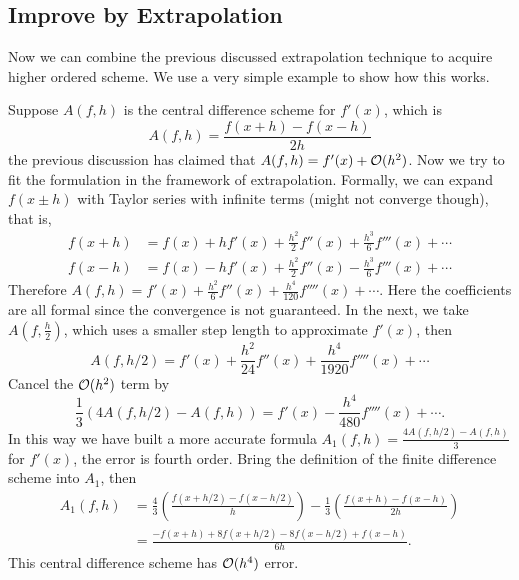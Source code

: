 \subsection{Improve by Extrapolation}
Now we can combine the previous discussed extrapolation technique to acquire higher ordered scheme. We use a very simple example to show how this works. 
\begin{example}
    Suppose $A(f, h)$ is the central difference scheme for $f'(x)$, which is 
    \begin{equation}
        A(f, h) = \frac{f(x + h) - f(x- h)}{2h}
    \end{equation}
    the previous discussion has claimed that $A(f, h) = f'(x) + \mathcal O(h^2)$. Now we try to fit the formulation in the framework of extrapolation. Formally, we can expand $f(x\pm h)$ with Taylor series with infinite terms (might not converge though), that is, 
    \begin{equation}
        \begin{aligned}
            f(x + h) &= f(x) + h f'(x) + \frac{h^2}{2} f''(x) + \frac{h^3}{6} f'''(x) + \cdots \\
            f(x - h) &= f(x) - h f'(x) + \frac{h^2}{2} f''(x) - \frac{h^3}{6} f'''(x) + \cdots 
        \end{aligned}
    \end{equation}
    Therefore $A(f, h) = f'(x) + \frac{h^2}{6} f''(x) + \frac{h^4}{120}f''''(x) + \cdots $. Here the coefficients are all formal since the convergence is not guaranteed. In the next, we take $A(f, \frac{h}{2})$, which uses a smaller step length to approximate $f'(x)$, then 
    \begin{equation}
        A(f, h/2) =  f'(x) + \frac{h^2}{24} f''(x) + \frac{h^4}{1920}f''''(x) + \cdots
    \end{equation}
    Cancel the $\mathcal O(h^2)$ term by $$\frac{1}{3}\left( 4 A(f, h/2) - A(f, h) \right) =  f'(x) - \frac{h^4}{480} f''''(x) +\cdots. $$
    In this way we have built a more accurate  formula $A_1(f, h) = \frac{4 A(f, h/2) - A(f, h)}{3}$ for $f'(x)$, the error is fourth order. Bring the definition of the finite difference scheme into $A_1$, then 
    \begin{equation}
        \begin{aligned}
        A_1(f, h) &= \frac{4}{3} \left(\frac{f(x + h/2) - f(x - h/2)}{h}\right) - \frac{1}{3} \left(\frac{f(x + h) - f(x - h)}{2h}\right) \\
        &= \frac{-f(x+ h) + 8 f(x + h/2) - 8 f(x - h/2) + f(x - h)}{6h}.
        \end{aligned}
    \end{equation}
    This central difference scheme has $\mathcal O(h^4)$ error. 
\end{example}
